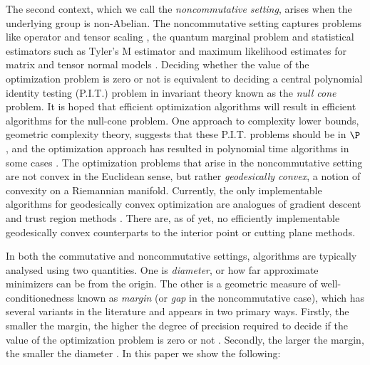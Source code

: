 The second context, which we call the \emph{noncommutative setting}, arises when the underlying group is non-Abelian. The noncommutative setting captures problems like operator and tensor scaling \cite{garg2016deterministic,burgisser2017alternating},  the quantum marginal problem \cite{burgisser2018efficient} and statistical estimators such as Tyler's M estimator \cite{franks2020rigorous} and maximum likelihood estimates for matrix and tensor normal models \cite{amendola2020invariant}. Deciding whether the value of the optimization problem is zero or not is equivalent to deciding a central polynomial identity testing (P.I.T.) problem in invariant theory known as the \emph{null cone} problem. It is hoped that efficient optimization algorithms will result in efficient algorithms for the null-cone problem.
One approach to complexity lower bounds, geometric complexity theory, suggests that these P.I.T. problems should be in $\P$ \cite{mulmuley2017geometric, garg2019search}, and the optimization approach has resulted in polynomial time algorithms in some cases \cite{garg2016deterministic, allen2018operator}. The optimization problems that arise in the noncommutative setting are not convex in the Euclidean sense, but rather \emph{geodesically convex}, a notion of convexity on a Riemannian manifold. Currently, the only implementable algorithms for geodesically convex optimization are analogues of gradient descent and trust region methods \cite{absil2008optimization, zhang2016first,allen2018operator}. There are, as of yet, no efficiently implementable geodesically convex counterparts to the interior point or cutting plane methods.


In both the commutative and noncommutative settings, algorithms are typically analysed using two quantities. One is \emph{diameter}, or how far approximate minimizers can be from the origin. The other is a geometric measure of well-conditionedness known as \emph{margin} (or \emph{gap} in the noncommutative case), which has several variants in the literature and appears in two primary ways. Firstly, the smaller the margin, the higher the degree of precision required to decide if the value of the optimization problem is zero or not \cite{gradflow, gurvits2004combinatorial}. Secondly, the larger the margin, the smaller the diameter \cite{singh2014entropy,straszak2017computing,gradflow,burgisser2020interior}. In this paper we show the following:


